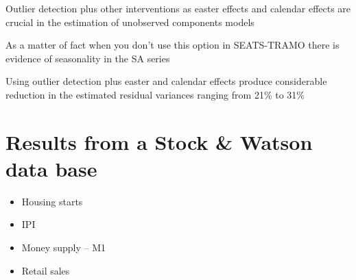 \begin{slide}
  \begin{wideitemize}
  \item Outlier detection plus other interventions as easter effects
    and calendar effects are crucial in the estimation of unobserved
    components models
  \item As a matter of fact when you don't use this option in
    SEATS-TRAMO there is evidence of seasonality in the SA
    series
  \item Using outlier detection plus easter and calendar effects
    produce considerable reduction in the estimated residual variances
    ranging from 21\% to 31\%
  \end{wideitemize}
\end{slide}

\section[S\&W data]{Results from a Stock \& Watson data base}

\begin{slide}
  
  \begin{itemize}
  \item Housing starts
  \item IPI
  \item Money supply -- M1
  \item Retail sales
  \end{itemize}
\end{slide}

\begin{slide}
  \begin{center}
  \end{center}
\end{slide}

